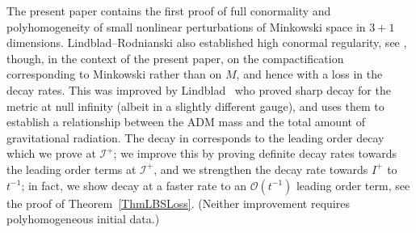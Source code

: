 \documentclass[reqno,11pt,letterpaper]{amsart}
\numberwithin{equation}{section}
\numberwithin{figure}{section}
\theoremstyle{definition}
\theoremstyle{remark}
\newcommand{\mc}{\mathcal}
\newcommand{\cO}{\mc O}
\newcommand{\ms}{\mathscr}
\newcommand{\scri}{\ms I}
\begin{document}
The present paper contains the first proof of full conormality and polyhomogeneity of small nonlinear perturbations of Minkowski space in $3+1$ dimensions. Lindblad--Rodnianski also established high conormal regularity, see \cite[Equation~(1.14)]{LindbladRodnianskiGlobalStability}, though, in the context of the present paper, on the compactification corresponding to Minkowski rather than on $M$, and hence with a loss in the decay rates. This was improved by Lindblad~\cite{LindbladAsymptotics} who proved sharp decay for the metric at null infinity (albeit in a slightly different gauge), and uses them to establish a relationship between the ADM mass and the total amount of gravitational radiation. The decay in \cite{LindbladAsymptotics} corresponds to the leading order decay which we prove at $\scri^+$; we improve this by proving definite decay rates towards the leading order terms at $\scri^+$, and we strengthen the decay rate towards $I^+$ to $t^{-1}$; in fact, we show decay at a faster rate to an $\cO(t^{-1})$ leading order term, see the proof of Theorem~\ref{ThmLBSLoss}. (Neither improvement requires polyhomogeneous initial data.)
\end{document}
